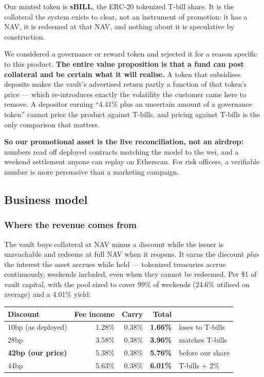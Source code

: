 \documentclass[11pt,a4paper]{article}
\begin{document}
Our minted token is \textbf{sBILL}, the ERC-20 tokenized T-bill share. It is the collateral the
system exists to clear, not an instrument of promotion: it has a NAV, it is redeemed at that NAV, and
nothing about it is speculative by construction.

We considered a governance or reward token and rejected it for a reason specific to this product.
\textbf{The entire value proposition is that a fund can post collateral and be certain what it will
realise.} A token that subsidises deposits makes the vault's advertised return partly a function of
that token's price — which re-introduces exactly the volatility the customer came here to remove. A
depositor earning ``4.41\% plus an uncertain amount of a governance token'' cannot price the product
against T-bills, and pricing against T-bills is the only comparison that matters.

\textbf{So our promotional asset is the live reconciliation, not an airdrop:} \reconCount{} numbers read off
deployed contracts matching the model to the wei, and a weekend settlement anyone can replay on
Etherscan. For risk officers, a verifiable number is more persuasive than a marketing campaign.

\subsection{Business model}\label{sec:business}

\subsubsection*{Where the revenue comes from}

The vault buys collateral at NAV minus a discount while the issuer is unreachable and redeems at full
NAV when it reopens. It earns the discount \emph{plus} the interest the asset accrues while held —
tokenized treasuries accrue continuously, weekends included, even when they cannot be redeemed. Per
\$1 of vault capital, with the pool sized to cover 99\% of weekends (24.6\% utilised on average) and
a 4.01\% yield:

\begin{center}
\small
\begin{tabular}{@{}lrrrp{4.0cm}@{}}
\toprule
\textbf{Discount} & \textbf{Fee income} & \textbf{Carry} & \textbf{Total} & \\
\midrule
10bp (as deployed) & 1.28\% & 0.38\% & \textbf{1.66\%} & loses to T-bills \\
28bp & 3.58\% & 0.38\% & \textbf{3.96\%} & matches T-bills \\
\textbf{42bp (our price)} & 5.38\% & 0.38\% & \textbf{5.76\%} & before our share \\
44bp & 5.63\% & 0.38\% & \textbf{6.01\%} & T-bills $+$ 2\% \\
\bottomrule
\end{tabular}
\end{center}
\end{document}
